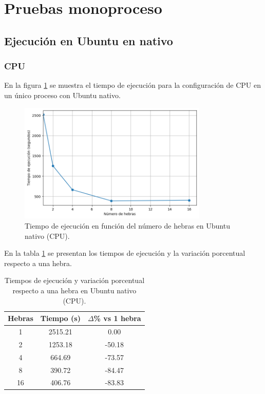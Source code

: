 \section{Pruebas monoproceso}

\subsection{Ejecución en Ubuntu en nativo}

\subsubsection{CPU}

En la figura \ref{fig:single-node_ubuntu_cpu_native_time} se muestra el tiempo de ejecución para la configuración de CPU en un único proceso con Ubuntu nativo.

\begin{figure}[ht]
    \centering
    \includegraphics[width=0.8\textwidth]{imagenes/cap5/single-node_ubuntu_cpu_native_time.png}
    \caption{Tiempo de ejecución en función del número de hebras en Ubuntu nativo (CPU).}
    \label{fig:single-node_ubuntu_cpu_native_time}
\end{figure}

En la tabla \ref{tab:single-node_ubuntu_cpu_native} se presentan los tiempos de ejecución y la variación porcentual respecto a una hebra.

\begin{table}[ht]
    \centering
    \begin{tabular}{|c|c|c|}
        \hline
        \textbf{Hebras} & \textbf{Tiempo (s)} & \textbf{$\Delta$\% vs 1 hebra} \\
        \hline
        1               & 2515.21             & 0.00                           \\
        2               & 1253.18             & -50.18                         \\
        4               & 664.69              & -73.57                         \\
        8               & 390.72              & -84.47                         \\
        16              & 406.76              & -83.83                         \\
        \hline
    \end{tabular}
    \caption{Tiempos de ejecución y variación porcentual respecto a una hebra en Ubuntu nativo (CPU).}
    \label{tab:single-node_ubuntu_cpu_native}
\end{table}

